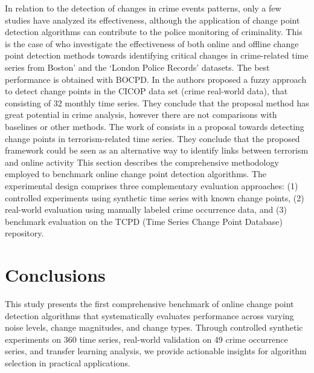 \documentclass[journal,article,submit,pdftex,moreauthors]{Definitions/mdpi}
\begin{document}
In relation to the detection of changes in crime events patterns, only a few studies have analyzed its effectiveness, although the application of change point detection algorithms can contribute to the police monitoring of criminality. This is the case of \cite{konstantinou2023trend} who investigate the effectiveness of both online and offline change point detection methods towards identifying critical changes in crime-related time series from Boston’ and the ‘London Police Records’ datasets. The best performance is obtained with BOCPD. In \cite{albertetti2016change} the authors proposed a fuzzy approach to detect change points in the CICOP data set (crime real-world data), that consisting of 32 monthly time series. They conclude that the proposal method has great potential in crime analysis, however there are not comparisons with baselines or other methods.  The work of \cite{theodosiadou2021change} consists in a proposal towards detecting change points in terrorism-related time series. They conclude that the proposed framework could be seen as an alternative way to identify links between terrorism and online activity
This section describes the comprehensive methodology employed to benchmark online change point detection algorithms. The experimental design comprises three complementary evaluation approaches: (1) controlled experiments using synthetic time series with known change points, (2) real-world evaluation using manually labeled crime occurrence data, and (3) benchmark evaluation on the TCPD (Time Series Change Point Database) repository.








\section{Conclusions}

This study presents the first comprehensive benchmark of online change point detection algorithms that systematically evaluates performance across varying noise levels, change magnitudes, and change types. Through controlled synthetic experiments on 360 time series, real-world validation on 49 crime occurrence series, and transfer learning analysis, we provide actionable insights for algorithm selection in practical applications.
\end{document}

